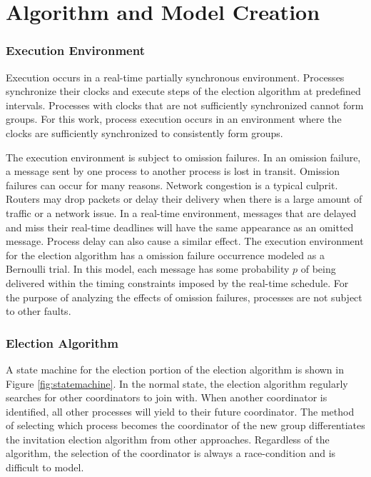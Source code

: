 \chapter{Algorithm and Model Creation}

\subsection{Execution Environment}

Execution occurs in a real-time partially synchronous environment.
Processes synchronize their clocks and execute steps of the election algorithm at predefined intervals.
Processes with clocks that are not sufficiently synchronized cannot form groups.
For this work, process execution occurs in an environment where the clocks are sufficiently synchronized to consistently form groups.

The execution environment is subject to omission failures.
In an omission failure, a message sent by one process to another process is lost in transit.
Omission failures can occur for many reasons.
Network congestion is a typical culprit.
Routers may drop packets or delay their delivery when there is a large amount of traffic or a network issue.
In a real-time environment, messages that are delayed and miss their real-time deadlines will have the same appearance as an omitted message.
Process delay can also cause a similar effect.
The execution environment for the election algorithm has a omission failure occurrence modeled as a Bernoulli trial.
In this model, each message has some probability $p$ of being delivered within the timing constraints imposed by the real-time schedule.
For the purpose of analyzing the effects of omission failures, processes are not subject to other faults.

\subsection{Election Algorithm}

A state machine for the election portion of the election algorithm is shown in Figure \ref{fig:statemachine}.
In the normal state, the election algorithm regularly searches for other coordinators to join with.
When another coordinator is identified, all other processes will yield to their future coordinator.
The method of selecting which process becomes the coordinator of the new group differentiates the invitation election algorithm from other approaches.
Regardless of the algorithm, the selection of the coordinator is always a race-condition and is difficult to model.

